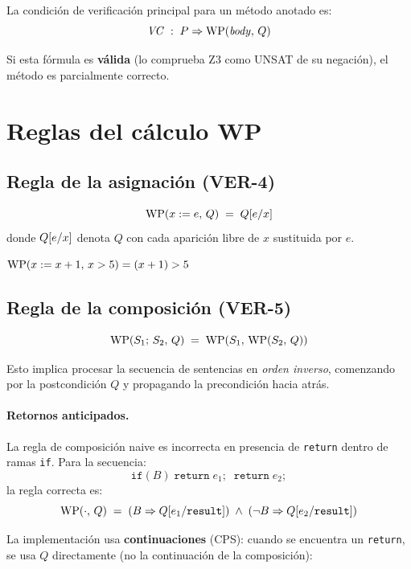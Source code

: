 La condición de verificación principal para un método anotado es:
\[
  \mathit{VC} \;:\; P \Rightarrow \WP{\mathit{body}}{Q}
\]

Si esta fórmula es \textbf{válida} (lo comprueba Z3 como UNSAT de su negación),
el método es parcialmente correcto.

\section{Reglas del cálculo WP}

\subsection{Regla de la asignación (VER-4)}

\begin{regla}[Asignación]
\[
  \WP{x := e}{Q} \;=\; \subst{Q}{x}{e}
\]
donde $\subst{Q}{x}{e}$ denota $Q$ con cada aparición libre de $x$
sustituida por $e$.
\end{regla}

\begin{ejemplo}
  $\WP{x := x+1}{x > 5} = (x+1) > 5$
\end{ejemplo}

\subsection{Regla de la composición (VER-5)}

\begin{regla}[Composición]
\[
  \WP{S_1;\,S_2}{Q} \;=\; \WP{S_1}{\WP{S_2}{Q}}
\]
\end{regla}

Esto implica procesar la secuencia de sentencias en \emph{orden inverso},
comenzando por la postcondición $Q$ y propagando la precondición hacia
atrás.

\paragraph{Retornos anticipados.}
La regla de composición naive es incorrecta en presencia de \texttt{return}
dentro de ramas \texttt{if}. Para la secuencia:
\[
  \texttt{if}(B)\;\texttt{return}\;e_1;\;\;\texttt{return}\;e_2;
\]
la regla correcta es:
\[
  \WP{\cdot}{Q} \;=\; (B \Rightarrow \subst{Q}{\mathtt{result}}{e_1})
                \;\wedge\; (\neg B \Rightarrow \subst{Q}{\mathtt{result}}{e_2})
\]

La implementación usa \textbf{continuaciones} (CPS): cuando se encuentra
un \texttt{return}, se usa $Q$ directamente (no la continuación de la
composición):

